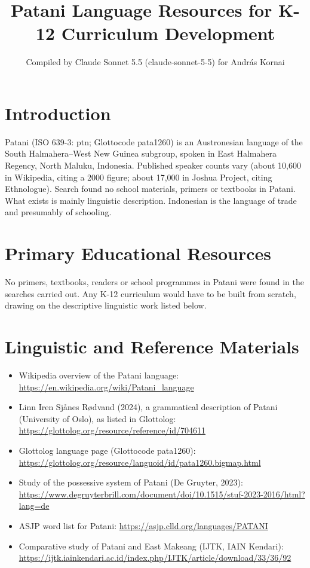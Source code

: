 \documentclass[12pt]{article}
\title{Patani Language Resources for K-12 Curriculum Development}
\author{Compiled by Claude Sonnet 5.5 (claude-sonnet-5-5) for Andr\'as Kornai}
\date{}
\begin{document}
\maketitle

\section{Introduction}
Patani (ISO 639-3: ptn; Glottocode pata1260) is an Austronesian language of the South Halmahera--West New Guinea subgroup, spoken in East Halmahera Regency, North Maluku, Indonesia. Published speaker counts vary (about 10,600 in Wikipedia, citing a 2000 figure; about 17,000 in Joshua Project, citing Ethnologue). Search found no school materials, primers or textbooks in Patani. What exists is mainly linguistic description. Indonesian is the language of trade and presumably of schooling.

\section{Primary Educational Resources}
No primers, textbooks, readers or school programmes in Patani were found in the searches carried out. Any K-12 curriculum would have to be built from scratch, drawing on the descriptive linguistic work listed below.

\section{Linguistic and Reference Materials}
\begin{itemize}
\item Wikipedia overview of the Patani language: \url{https://en.wikipedia.org/wiki/Patani_language}
\item Linn Iren Sj{\aa}nes R{\o}dvand (2024), a grammatical description of Patani (University of Oslo), as listed in Glottolog: \url{https://glottolog.org/resource/reference/id/704611}
\item Glottolog language page (Glottocode pata1260): \url{https://glottolog.org/resource/languoid/id/pata1260.bigmap.html}
\item Study of the possessive system of Patani (De Gruyter, 2023): \url{https://www.degruyterbrill.com/document/doi/10.1515/stuf-2023-2016/html?lang=de}
\item ASJP word list for Patani: \url{https://asjp.clld.org/languages/PATANI}
\item Comparative study of Patani and East Makeang (IJTK, IAIN Kendari): \url{https://ijtk.iainkendari.ac.id/index.php/IJTK/article/download/33/36/92}
\end{itemize}
\end{document}
